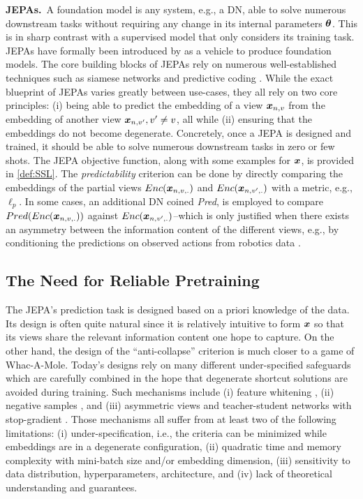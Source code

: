 {\bf JEPAs.}~A foundation model is any system, e.g., a DN, able to solve numerous downstream tasks without requiring any change in its internal parameters ${\bm{\theta}}$. This is in sharp contrast with a supervised model that only considers its training task. JEPAs have formally been introduced by \citet{lecun2022path} as a vehicle to produce foundation models. The core building blocks of JEPAs rely on numerous well-established techniques such as siamese networks \citep{bromley1993signature} and predictive coding \citep{helmholtz1867handbook,bruner1949perception}. While the exact blueprint of JEPAs varies greatly between use-cases, they all rely on two core principles: (i) being able to predict the embedding of a view ${\bm{x}}_{n,v}$ from the embedding of another view ${\bm{x}}_{n,v'}, v' \not = v$, all while (ii) ensuring that the embeddings do not become degenerate. Concretely, once a JEPA is designed and trained, it should be able to solve numerous downstream tasks in zero or few shots. 
The JEPA objective function, along with some examples for ${\bm{x}}$, is provided in \cref{def:SSL}. The {\em predictability} criterion can be done by directly comparing the embeddings of the partial views $Enc({\bm{x}}_{n,v,.})$ and $Enc({\bm{x}}_{n,v',.})$ with a metric, e.g., $\ell_p$. In some cases, an additional DN coined {\em Pred}, is employed to compare $Pred(Enc({\bm{x}}_{n,v,.}))$ against $Enc({\bm{x}}_{n,v',.})$--which is only justified when there exists an asymmetry between the information content of the different views, e.g., by conditioning the predictions on observed actions from robotics data \citep{khazatsky2024droid}. 



\subsection{The Need for Reliable Pretraining}
\label{sec:JEPA}


The JEPA's prediction task is designed based on a priori knowledge of the data. Its design is often quite natural since it is relatively intuitive to form ${\bm{x}}$ so that its views share the relevant information content one hope to capture. On the other hand, the design of the ``anti-collapse'' criterion is much closer to a game of Whac-A-Mole. Today's designs rely on many different under-specified safeguards which are carefully combined in the hope that degenerate shortcut solutions are avoided during training. Such mechanisms include (i) feature whitening \citep{ermolov2021whitening,bardes2021vicreg}, (ii) negative samples \citep{chen2020simple,he2020momentum}, and (iii) asymmetric views and teacher-student networks with stop-gradient \citep{caron2021emerging,assran2023self}. Those mechanisms all suffer from at least two of the following limitations: (i) under-specification, i.e., the criteria can be minimized while embeddings are in a degenerate configuration, (ii) quadratic time and memory complexity with mini-batch size and/or embedding dimension, (iii) sensitivity to data distribution, hyperparameters, architecture, and (iv) lack of theoretical understanding and guarantees. 






